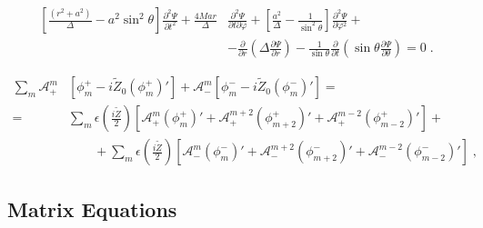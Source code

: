 \begin{equation}
	\begin{aligned}
		\left[  \frac{(r^2 + a^2)}{\Delta} - a^2 \sin^2 \theta\right]\frac{\partial^2 \Psi}{\partial t^2} + \frac{4M a r}{\Delta} &\frac{\partial^2 \Psi}{\partial t \partial \varphi} + \left[ \frac{a^2}{\Delta} - \frac{1}{\sin^2 \theta}\right] \frac{\partial^2 \Psi}{\partial \varphi^2} + \\[10pt] & - \frac{\partial}{\partial r} \left( \Delta \frac{\partial  \Psi}{\partial r}\right) - \frac{1}{\sin \theta} \frac{\partial}{\partial t}\left( \sin \theta \frac{\partial \Psi}{\partial \theta}\right) = 0 \; .
	\end{aligned}
\end{equation}

\vspace{0.4cm}

\begin{equation}
	\begin{aligned}
		\sum_{m} \mathcal{A}_{+}^{m}&\left[ \phi_m^+ - i \tilde{Z}_0 \left(\phi_m^+\right)'   \right] + \mathcal{A}_{-}^{m}\left[ \phi_m^- - i \tilde{Z}_0 \left(\phi_m^-\right)'   \right] = \\
		=&\sum_{m} \epsilon \left(\frac{i  \tilde{Z}}{2}\right) \left[ \mathcal{A}_{+}^{m} \left(\phi_m^+\right)' + \mathcal{A}_{+}^{m+2} \left(\phi_{m+2}^+\right)' + \mathcal{A}_{+}^{m-2} \left(\phi_{m-2}^+\right)'  \right] + \\
		& \qquad +\sum_{m} \epsilon \left(\frac{i  \tilde{Z}}{2}\right) \left[ \mathcal{A}_{-}^{m} \left(\phi_m^-\right)' + \mathcal{A}_{-}^{m+2} \left(\phi_{m+2}^-\right)' + \mathcal{A}_{-}^{m-2} \left(\phi_{m-2}^-\right)'  \right] \; ,
	\end{aligned}
	\label{eq:infinite_set_of_equations}
\end{equation}
%

\vspace{0.4cm}

\subsection*{Matrix Equations}
\vspace{0.4cm}

